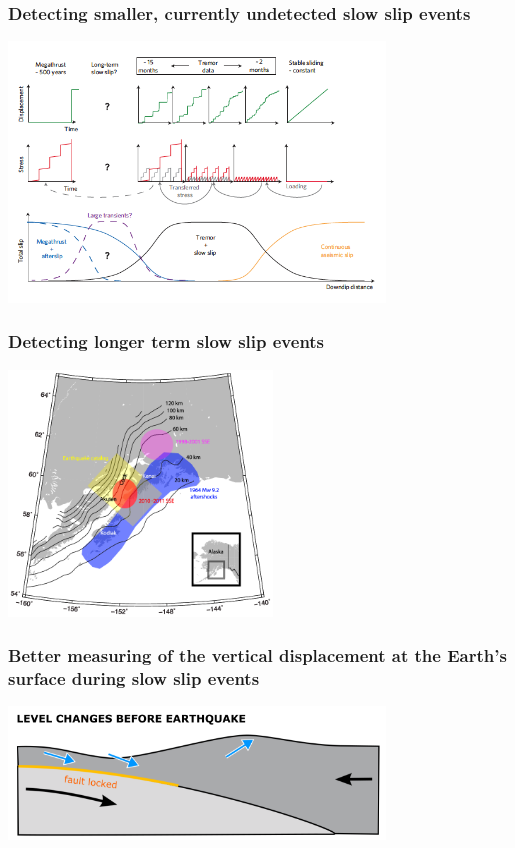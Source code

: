 \documentclass{beamer}
\begin{document}
	\begin{frame}
		\frametitle{Detecting smaller, currently undetected slow slip events}
		\begin{center}
			\includegraphics[trim={0cm 0cm 0cm 0cm}, clip, width=10cm]{articles/wech_creager_2011_3.png}
		\end{center}
	\end{frame}

	\begin{frame}
		\frametitle{Detecting longer term slow slip events}
		\begin{center}
			\includegraphics[trim={0cm 0cm 0cm 0cm}, clip, width=7cm]{articles/wei_al_2012_1.png}
		\end{center}
	\end{frame}

	\begin{frame}
		\frametitle{Better measuring of the vertical displacement at the Earth’s surface during slow slip events}
		\begin{center}
			\includegraphics[trim={0cm 0cm 0cm 0cm}, clip, width=10cm]{slowslip/Prequake_level_changes_shallow_thrust.png}
		\end{center}
	\end{frame}
\end{document}
